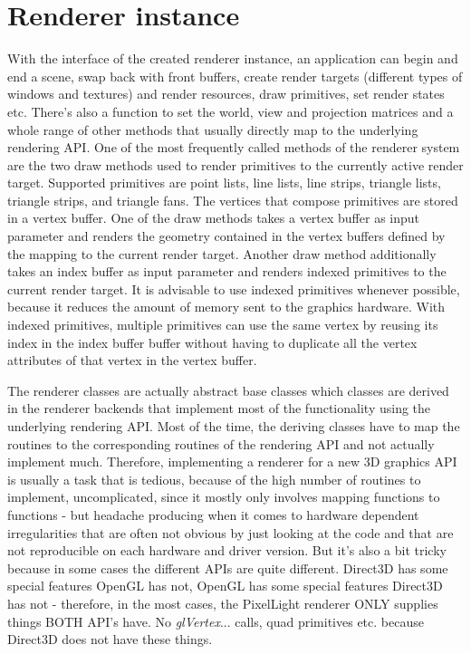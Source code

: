 \section{Renderer instance}
With the interface of the created renderer instance, an application can begin and end a scene, swap back with front buffers, create render targets (different types of windows and textures) and render resources, draw primitives, set render states etc. There's also a function to set the world, view and projection matrices and a whole range of other methods that usually directly map to the underlying rendering API. One of the most frequently called methods of the renderer system are the two draw methods used to render primitives to the currently active render target. Supported primitives are point lists, line lists, line strips, triangle lists, triangle strips, and triangle fans. The vertices that compose primitives are stored in a vertex buffer. One of the draw methods takes a vertex buffer as input parameter and renders the geometry contained in the vertex buffers defined by the mapping to the current render target. Another draw method additionally takes an index buffer as input parameter and renders indexed primitives to the current render target. It is advisable to use indexed primitives whenever possible, because it reduces the amount of memory sent to the graphics hardware. With indexed primitives, multiple primitives can use the same vertex by reusing its index in the index buffer buffer without having to duplicate all the vertex attributes of that vertex in the vertex buffer.

The renderer classes are actually abstract base classes which classes are derived in the renderer backends that implement most of the functionality using the underlying rendering API. Most of the time, the deriving classes have to map the routines to the corresponding routines of the rendering API and not actually implement much. Therefore, implementing a renderer for a new 3D graphics API is usually a task that is tedious, because of the high number of routines to implement, uncomplicated, since it mostly only involves mapping functions to functions - but headache producing when it comes to hardware dependent irregularities that are often not obvious by just looking at the code and that are not reproducible on each hardware and driver version. But it's also a bit tricky because in some cases the different APIs are quite different. Direct3D has some special features OpenGL has not, OpenGL has some special features Direct3D has not - therefore, in the most cases, the PixelLight renderer ONLY supplies things BOTH API's have. No \emph{glVertex}... calls, quad primitives etc. because Direct3D does not have these things.




